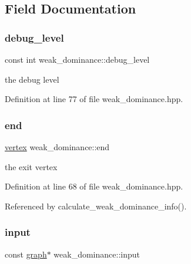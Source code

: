 \subsection{Field Documentation}
\mbox{\label{classweak__dominance_a44dd8f13a4b8167976ec43dcde3be35b}} 
\subsubsection{\texorpdfstring{debug\+\_\+level}{debug\_level}}
{\footnotesize\ttfamily const int weak\+\_\+dominance\+::debug\+\_\+level\hspace{0.3cm}{\ttfamily [private]}}



the debug level 



Definition at line 77 of file weak\+\_\+dominance.\+hpp.

\mbox{\label{classweak__dominance_abce743ae8d9bfcbe54818555e9d3b3a0}} 
\subsubsection{\texorpdfstring{end}{end}}
{\footnotesize\ttfamily \hyperlink{graph_8hpp_abefdcf0544e601805af44eca032cca14}{vertex} weak\+\_\+dominance\+::end\hspace{0.3cm}{\ttfamily [private]}}



the exit vertex 



Definition at line 68 of file weak\+\_\+dominance.\+hpp.



Referenced by calculate\+\_\+weak\+\_\+dominance\+\_\+info().

\mbox{\label{classweak__dominance_a6d2d93153e9a80597ccb97bd40e6a968}} 
\subsubsection{\texorpdfstring{input}{input}}
{\footnotesize\ttfamily const \hyperlink{structgraph}{graph}$\ast$ weak\+\_\+dominance\+::input\hspace{0.3cm}{\ttfamily [private]}}



